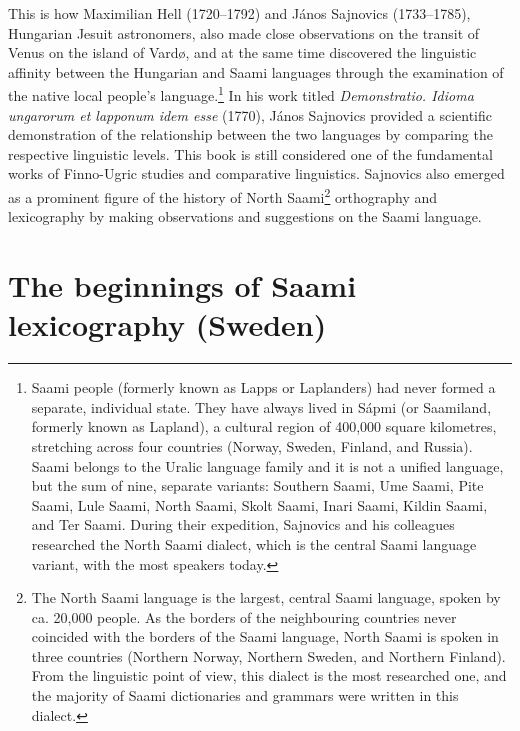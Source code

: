 \documentclass[output=paper,colorlinks,citecolor=brown,arabicfont,chinesefont]{langscibook}
\begin{document}
This is how Maximilian Hell (1720--1792) and János Sajnovics (1733--1785), Hungarian Jesuit astronomers, also made close observations on the transit of Venus on the island of Vardø, and at the same time discovered the linguistic affinity between the Hungarian and Saami languages through the examination of the native local people’s language.\footnote{Saami people (formerly known as Lapps or Laplanders) had never formed a separate, individual state. They have always lived in Sápmi (or Saamiland, formerly known as Lapland), a cultural region of 400,000 square kilometres, stretching across four countries (Norway, Sweden, Finland, and Russia). Saami belongs to the Uralic language family and it is not a unified language, but the sum of nine, separate variants: Southern Saami, Ume Saami, Pite Saami, Lule Saami, North Saami, Skolt Saami, Inari Saami, Kildin Saami, and Ter Saami. During their expedition, Sajnovics and his colleagues researched the North Saami dialect, which is the central Saami language variant, with the most speakers today.} In his work titled \emph{Demonstratio. Idioma ungarorum et lapponum idem esse} (1770), János Sajnovics provided a scientific demonstration of the relationship between the two languages by comparing the respective linguistic levels. This book is still considered one of the fundamental works of Finno-Ugric studies and comparative linguistics. Sajnovics also emerged as a prominent figure of the history of North Saami\footnote{The North Saami language is the largest, central Saami language, spoken by ca. 20,000 people. As the borders of the neighbouring countries never coincided with the borders of the Saami language, North Saami is spoken in three countries (Northern Norway, Northern Sweden, and Northern Finland). From the linguistic point of view, this dialect is the most researched one, and the majority of Saami dictionaries and grammars were written in this dialect.} orthography and lexicography by making observations and suggestions on the Saami language.

\section{The beginnings of Saami lexicography (Sweden)}
\end{document}
